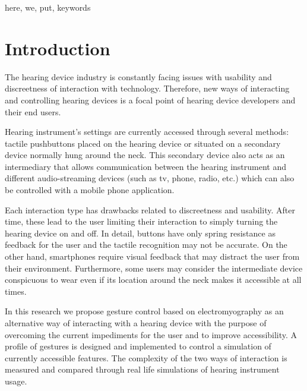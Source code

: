\documentclass[journal]{./IEEEtran}
\begin{document}
\begin{IEEEkeywords}
here, we, put, keywords
\end{IEEEkeywords}



\section{Introduction}
The hearing device industry is constantly facing issues with usability and discreetness of interaction with technology. Therefore, new ways of interacting and controlling hearing devices is a focal point of hearing device developers and their end users. 

Hearing instrument’s settings are currently accessed through several methods: tactile pushbuttons placed on the hearing device or situated on a secondary device normally hung around the neck. This secondary device also acts as an intermediary that allows communication between the hearing instrument and different audio-streaming devices (such as tv,  phone, radio, etc.) which can also be controlled with a mobile phone application.

Each interaction type has  drawbacks related to discreetness and usability. After time, these lead to the user limiting their interaction to simply turning the hearing device on and off. In detail, buttons have only spring resistance as feedback for the user and the tactile recognition may not be accurate. On the other hand, smartphones require visual feedback that may distract the user from their environment. Furthermore, some users may consider the intermediate device conspicuous to wear even if its location around the neck makes it accessible at all times.

In this research we propose gesture control based on electromyography as an alternative way of interacting with a hearing device with the purpose of overcoming the current impediments for the user and to improve accessibility. A profile of gestures is designed and implemented to control a simulation of currently accessible features. The complexity of the two ways of interaction is measured and compared through real life simulations of hearing instrument usage.
\end{document}
